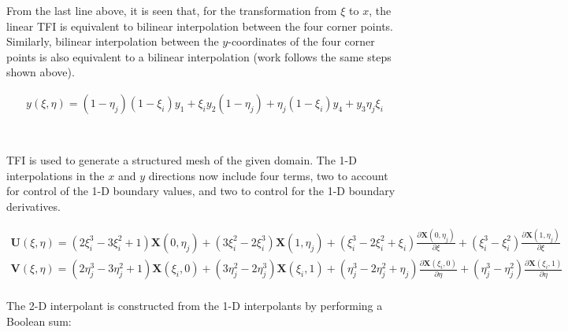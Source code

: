 \documentclass[10pt]{article}
\begin{document}
From the last line above, it is seen that, for the transformation from \(\xi\) to \(x\), the linear TFI is equivalent to bilinear interpolation between the four corner points. Similarly, bilinear interpolation between the \(y\)-coordinates of the four corner points is also equivalent to a bilinear interpolation (work follows the same steps shown above).

\begin{equation}
\begin{aligned}
y(\xi,\eta)= (1-\eta_j)(1-\xi_i)y_1+\xi_i y_2(1-\eta_j)+\eta_j(1-\xi_i)y_4+ y_3\eta_j\xi_i\\
\end{aligned}
\end{equation}

\section{}

TFI is used to generate a structured mesh of the given domain. The 1-D interpolations in the \(x\) and \(y\) directions now include four terms, two to account for control of the 1-D boundary values, and two to control for the 1-D boundary derivatives.

\begin{equation}
\begin{aligned}
\textbf{U}(\xi,\eta)=(2\xi_i^3-3\xi_i^2+1)\textbf{X}(0,\eta_j)+(3\xi_i^2-2\xi_i^3)\textbf{X}(1,\eta_j)+(\xi_i^3-2\xi_i^2+\xi_i)\frac{\partial\textbf{X}(0,\eta_j)}{\partial\xi}+(\xi_i^3-\xi_i^2)\frac{\partial\textbf{X}(1,\eta_j)}{\partial\xi}\\
\textbf{V}(\xi,\eta)=(2\eta_j^3-3\eta_j^2+1)\textbf{X}(\xi_i,0)+(3\eta_j^2-2\eta_j^3)\textbf{X}(\xi_i,1)+(\eta_j^3-2\eta_j^2+\eta_j)\frac{\partial\textbf{X}(\xi_i,0)}{\partial\eta}+(\eta_j^3-\eta_j^2)\frac{\partial\textbf{X}(\xi_i,1)}{\partial\eta}\\
\end{aligned}
\end{equation}

The 2-D interpolant is constructed from the 1-D interpolants by performing a Boolean sum:
\end{document}
